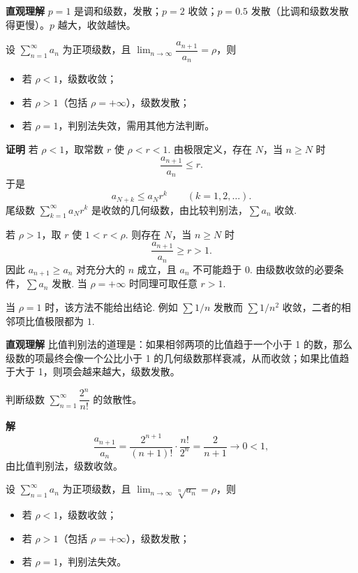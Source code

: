 \documentclass[fontset=fandol]{ctexart}
\newenvironment{custom}[1]{\par\noindent\textbf{#1}\quad}{\par\vspace{0.8em}}
\begin{document}
\begin{custom}{直观理解}
\(p=1\) 是调和级数，发散；\(p=2\) 收敛；\(p=0.5\) 发散（比调和级数发散得更慢）。\(p\) 越大，收敛越快。
\end{custom}

\begin{theorem}
设 \(\sum_{n=1}^{\infty} a_n\) 为正项级数，且 \(\lim_{n\to\infty} \dfrac{a_{n+1}}{a_n} = \rho\)，则
\begin{itemize}
\item 若 \(\rho < 1\)，级数收敛；
\item 若 \(\rho > 1\)（包括 \(\rho = +\infty\)），级数发散；
\item 若 \(\rho = 1\)，判别法失效，需用其他方法判断。
\end{itemize}
\end{theorem}

\begin{custom}{证明}
若 $\rho<1$，取常数 $r$ 使 $\rho<r<1$. 由极限定义，存在 $N$，当 $n\ge N$ 时
\[
\frac{a_{n+1}}{a_n}\le r.
\]
于是
\[
a_{N+k}\le a_N r^k\qquad(k=1,2,\ldots).
\]
尾级数 $\sum_{k=1}^{\infty}a_N r^k$ 是收敛的几何级数，由比较判别法，$\sum a_n$ 收敛.

若 $\rho>1$，取 $r$ 使 $1<r<\rho$. 则存在 $N$，当 $n\ge N$ 时
\[
\frac{a_{n+1}}{a_n}\ge r>1.
\]
因此 $a_{n+1}\ge a_n$ 对充分大的 $n$ 成立，且 $a_n$ 不可能趋于 $0$. 由级数收敛的必要条件，$\sum a_n$ 发散. 当 $\rho=+\infty$ 时同理可取任意 $r>1$.

当 $\rho=1$ 时，该方法不能给出结论. 例如 $\sum 1/n$ 发散而 $\sum 1/n^2$ 收敛，二者的相邻项比值极限都为 $1$.
\end{custom}

\begin{custom}{直观理解}
比值判别法的道理是：如果相邻两项的比值趋于一个小于 1 的数，那么级数的项最终会像一个公比小于 1 的几何级数那样衰减，从而收敛；如果比值趋于大于 1，则项会越来越大，级数发散。
\end{custom}

\begin{example}
判断级数 \(\sum_{n=1}^{\infty} \dfrac{2^n}{n!}\) 的敛散性。
\end{example}
\begin{custom}{解}
\[
\dfrac{a_{n+1}}{a_n} = \dfrac{2^{n+1}}{(n+1)!} \cdot \dfrac{n!}{2^n} = \dfrac{2}{n+1} \to 0 < 1,
\]
由比值判别法，级数收敛。
\end{custom}

\begin{theorem}
设 \(\sum_{n=1}^{\infty} a_n\) 为正项级数，且 \(\lim_{n\to\infty} \sqrt[n]{a_n} = \rho\)，则
\begin{itemize}
\item 若 \(\rho < 1\)，级数收敛；
\item 若 \(\rho > 1\)（包括 \(\rho = +\infty\)），级数发散；
\item 若 \(\rho = 1\)，判别法失效。
\end{itemize}
\end{theorem}
\end{document}
